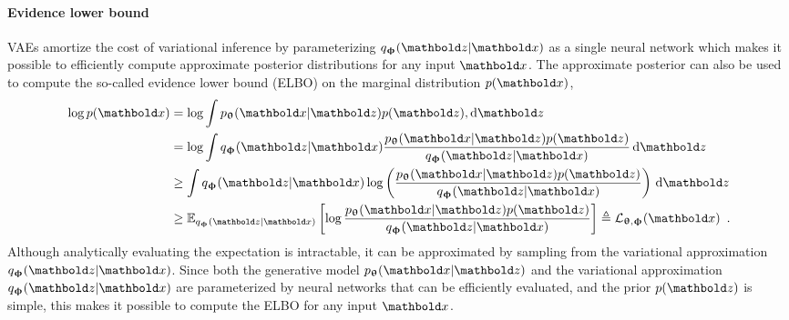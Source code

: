 \paragraph{Evidence lower bound}
VAEs amortize the cost of variational inference by parameterizing $q_\phib(\zb|\xb)$ as a single neural network which makes it possible to efficiently compute approximate posterior distributions for any input $\xb$. The approximate posterior can also be used to compute the so-called evidence lower bound (ELBO) on the marginal distribution $p(\xb)$, 
%
 \begin{align} \label{eq:variational-autoencoder-elbo}
    \log p(\xb)
    &= \log \int p_\thetab(\xb|\zb)p(\zb),\textrm{d}\zb \nonumber \\
    &= \log \int q_\phib(\zb|\xb) \frac{p_\thetab(\xb|\zb)p(\zb)}{q_\phib(\zb|\xb)}\,\textrm{d}\zb \nonumber \\
    &\geq \int q_\phib(\zb|\xb) \log \left( \frac{p_\thetab(\xb|\zb)p(\zb)}{q_\phib(\zb|\xb)} \right) \,\textrm{d}\zb \nonumber \\
    &\geq \mathbb{E}_{q_\phib(\zb|\xb)} \left[ \log \frac{p_\thetab(\xb|\zb)p(\zb)}{q_\phib(\zb|\xb)} \right] \triangleq \mathcal{L}_{\thetab,\phib}(\xb) \enspace .
\end{align}
%
Although analytically evaluating the expectation is intractable, it can be approximated by sampling from the variational approximation $q_\phib(\zb|\xb)$. 
Since both the generative model $p_\thetab(\xb|\zb)$ and the variational approximation $q_\phib(\zb|\xb)$ are parameterized by neural networks that can be efficiently evaluated, and the prior $p(\zb)$ is simple, this makes it possible to compute the ELBO for any input $\xb$.

